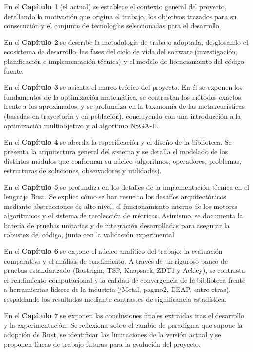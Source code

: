 \documentclass[12pt,a4paper,twoside,openright]{book}
\begin{document}
    En el \textbf{Capítulo 1} (el actual) se establece el contexto general del proyecto, detallando la motivación que origina el trabajo, los objetivos trazados para su consecución y el conjunto de tecnologías seleccionadas para el desarrollo.

    En el \textbf{Capítulo 2} se describe la metodología de trabajo adoptada, desglosando el ecosistema de desarrollo, las fases del ciclo de vida del software (investigación, planificación e implementación técnica) y el modelo de licenciamiento del código fuente.
    
    En el \textbf{Capítulo 3} se asienta el marco teórico del proyecto. En él se exponen los fundamentos de la optimización matemática, se contrastan los métodos exactos frente a los aproximados, y se profundiza en la taxonomía de las metaheurísticas (basadas en trayectoria y en población), concluyendo con una introducción a la optimización multiobjetivo y al algoritmo NSGA-II.
    
    En el \textbf{Capítulo 4} se aborda la especificación y el diseño de la biblioteca. Se presenta la arquitectura general del sistema y se detalla el modelado de los distintos módulos que conforman su núcleo (algoritmos, operadores, problemas, estructuras de soluciones, observadores y utilidades).
    
    En el \textbf{Capítulo 5} se profundiza en los detalles de la implementación técnica en el lenguaje Rust. Se explica cómo se han resuelto los desafíos arquitectónicos mediante abstracciones de alto nivel, el funcionamiento interno de los motores algorítmicos y el sistema de recolección de métricas. Asimismo, se documenta la batería de pruebas unitarias y de integración desarrolladas para asegurar la robustez del código, junto con la validación experimental.
    
    En el \textbf{Capítulo 6} se expone el núcleo analítico del trabajo: la evaluación comparativa y el análisis de rendimiento. A través de un riguroso banco de pruebas estandarizado (Rastrigin, TSP, Knapsack, ZDT1 y Ackley), se contrasta el rendimiento computacional y la calidad de convergencia de la biblioteca frente a herramientas líderes de la industria (jMetal, pagmo2, DEAP, entre otras), respaldando los resultados mediante contrastes de significancia estadística.
    
    En el \textbf{Capítulo 7} se exponen las conclusiones finales extraídas tras el desarrollo y la experimentación. Se reflexiona sobre el cambio de paradigma que supone la adopción de Rust, se identifican las limitaciones de la versión actual y se proponen líneas de trabajo futuras para la evolución del proyecto.
    
\end{document}
